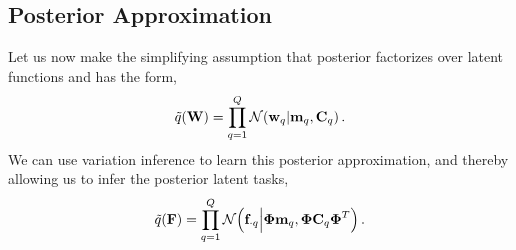 \subsection{Posterior Approximation}
 Let us now make the simplifying assumption that posterior factorizes over 
 latent functions and has the
form,
\begin{equation}
	\label{eq:posteriorW}
    \tilde{q}\!\left({\mathbf{W}}\right) = \prod^Q_{q=1} \mathcal{N}\!\left({\mathbf{w}_q}\middle\vert{\ensuremath{\mathbf{m}}_q, \ensuremath{\mathbf{C}}_q}\right).
\end{equation}
We can use variation inference to learn this posterior approximation, and
thereby allowing us to infer the posterior latent tasks,
\begin{equation}
\label{eq:posteriorF}
\tilde{q}\!\left({\mathbf{F}}\right)  = \prod^Q_{q=1} \mathcal{N}\!\left({\mathbf{f}_{\cdot q}}\middle\vert{\ensuremath{\boldsymbol\Phi}\ensuremath{\mathbf{m}}_q, \ensuremath{\boldsymbol\Phi}\ensuremath{\mathbf{C}}_q  \ensuremath{\boldsymbol\Phi}^T}\right) \text{.}
\end{equation}
%
%

